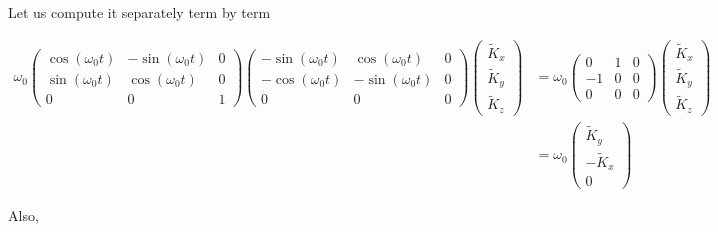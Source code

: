 \documentclass{article}
\begin{document}
Let us compute it separately term by term

\begin{align}
    \omega_{0}
    \left(\begin{array}{ccc}
        \cos(\omega_{0}t) & -\sin(\omega_{0}t) & 0\\
        \sin(\omega_{0}t) & \cos(\omega_{0}t) & 0\\
        0 & 0 & 1
    \end{array}\right)
    \left(\begin{array}{ccc}
        -\sin(\omega_{0}t) & \cos(\omega_{0}t) & 0\\
        -\cos(\omega_{0}t) & -\sin(\omega_{0}t) & 0\\
        0 & 0 & 0
    \end{array}\right)
    \left(\begin{array}{c}
        \tilde{K}_{x}\\
        \tilde{K}_{y}\\
        \tilde{K}_{z}
    \end{array}\right)&= 
    \omega_{0}
    \left(\begin{array}{ccc}
       0 & 1 & 0\\
       -1 & 0 & 0\\
        0 & 0 & 0
    \end{array}\right)
    \left(\begin{array}{c}
        \tilde{K}_{x}\\
        \tilde{K}_{y}\\
        \tilde{K}_{z}
    \end{array}\right)\\
    &=
    \omega_{0}
    \left(\begin{array}{c}
        \tilde{K}_{y}\\
        -\tilde{K}_{x}\\
        0
    \end{array}\right)
\end{align}

Also,
\end{document}
